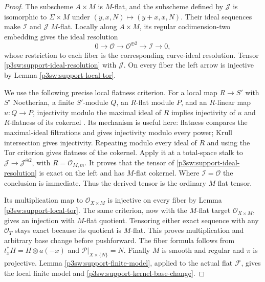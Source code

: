 \documentclass[11pt]{article}
\numberwithin{equation}{section}
\begin{document}
\begin{proof}
The subscheme \(A\times M\) is \(M\)-flat, and the subscheme defined
by \(\mathscr J\) is isomorphic to \(\Sigma\times M\) under
\((y,x,N)\mapsto(y+x,x,N)\).  Their ideal sequences make
\(\mathscr I\) and \(\mathscr J\) \(M\)-flat.
Locally along \(A\times M\), its regular codimension-two embedding
gives the ideal resolution
\begin{equation}
 0\longrightarrow\mathcal O
 \longrightarrow\mathcal O^{\oplus2}
 \longrightarrow\mathscr I\longrightarrow0,
 \label{p3sw:support-ideal-resolution}
\end{equation}
whose restriction to each fiber is the corresponding curve-ideal
resolution.  Tensor \eqref{p3sw:support-ideal-resolution} with \(\mathscr J\).  On every fiber the
left arrow is injective by Lemma \ref{p3sw:support-local-tor}.

We use the following precise local flatness criterion.  For a local
map \(R\to S'\) with \(S'\) Noetherian, a finite \(S'\)-module \(Q\),
an \(R\)-flat module \(P\), and an \(R\)-linear map \(u:Q\to P\),
injectivity modulo the maximal ideal of \(R\) implies injectivity
of \(u\) and \(R\)-flatness of its cokernel
\cite[Lemma 10.99.1, Tag 00MD]{P3SWStacks}.
Its mechanism is useful here: flatness compares the maximal-ideal
filtrations and gives injectivity modulo every power; Krull
intersection gives injectivity.  Repeating modulo every ideal of
\(R\) and using the Tor criterion gives flatness of the cokernel.
Apply it at a total-space stalk to
\(\mathscr J\to\mathscr J^{\oplus2}\), with
\(R=\mathcal O_{M,m}\).  It proves that the tensor of \eqref{p3sw:support-ideal-resolution} is exact
on the left and has \(M\)-flat cokernel.  Where
\(\mathscr I=\mathcal O\) the conclusion is immediate.
Thus the derived tensor is the ordinary \(M\)-flat tensor.

Its multiplication map to \(\mathcal O_{X\times M}\) is injective
on every fiber by Lemma \ref{p3sw:support-local-tor}.  The same
criterion, now with the \(M\)-flat target
\(\mathcal O_{X\times M}\), gives an injection with \(M\)-flat
quotient.  Tensoring either exact sequence with any
\(\mathcal O_T\) stays exact because its quotient is \(M\)-flat.
This proves multiplication and arbitrary base change before
pushforward.  The fiber formula follows from
\(t_x^*H=H\otimes a(-x)\) and
\(\mathcal P|_{X\times\{N\}}=N\).
Finally \(M\) is smooth and regular and \(\pi\) is projective.
Lemma \ref{p3sw:support-finite-model}, applied to the actual flat
\(\mathscr F\), gives the local finite model and \eqref{p3sw:support-kernel-base-change}.
\end{proof}
\end{document}
